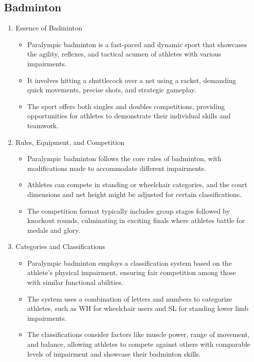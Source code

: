 \subsection{Badminton}

\begin{enumerate}

\item Essence of Badminton
    \begin{itemize}
    \item Paralympic badminton is a fast-paced and dynamic sport that showcases the agility, reflexes, and tactical acumen of athletes with various impairments.
    \item It involves hitting a shuttlecock over a net using a racket, demanding quick movements, precise shots, and strategic gameplay. 
    \item The sport offers both singles and doubles competitions, providing opportunities for athletes to demonstrate their individual skills and teamwork.
    \end{itemize}

\item Rules, Equipment, and Competition
    \begin{itemize}
    \item Paralympic badminton follows the core rules of badminton, with modifications made to accommodate different impairments. 
    \item Athletes can compete in standing or wheelchair categories, and the court dimensions and net height might be adjusted for certain classifications. 
    \item The competition format typically includes group stages followed by knockout rounds, culminating in exciting finals where athletes battle for medals and glory.
    \end{itemize}

\item Categories and Classifications
    \begin{itemize}
    \item Paralympic badminton employs a classification system based on the athlete's physical impairment, ensuring fair competition among those with similar functional abilities. 
    \item The system uses a combination of letters and numbers to categorize athletes, such as WH for wheelchair users and SL for standing lower limb impairments. 
    \item The classifications consider factors like muscle power, range of movement, and balance, allowing athletes to compete against others with comparable levels of impairment and showcase their badminton skills.
    \end{itemize}

\end{enumerate}